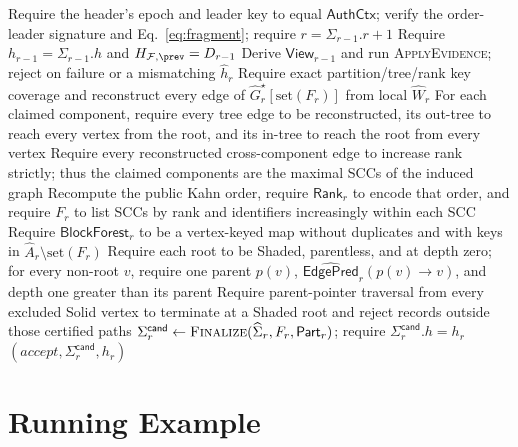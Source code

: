 \begin{algorithm}[h!]
\caption{\textsc{VerifyFragment}: Expanded Verification}
\label{alg:verify-fragment-expanded}
\footnotesize
{}
Require the header's epoch and leader key to equal $\mathsf{AuthCtx}$; verify
the order-leader signature and Eq.~\eqref{eq:fragment}; require
$r=\Sigma_{r-1}.r+1$\;
Require $h_{r-1}=\Sigma_{r-1}.h$ and
$H_{\mathcal F,\prev}=D_{r-1}$\;
Derive $\mathsf{View}_{r-1}$ and run
\textsc{ApplyEvidence}; reject on failure or a mismatching $\widehat h_r$\;
Require exact partition/tree/rank key coverage and reconstruct every edge of
$\widehat G_r^\star[\mathrm{set}(F_r)]$ from local $\widehat W_r$\;
For each claimed component, require every tree edge to be reconstructed, its
out-tree to reach every vertex from the root, and its in-tree to reach the root
from every vertex\;
Require every reconstructed cross-component edge to increase rank strictly;
thus the claimed components are the maximal SCCs of the induced graph\;
Recompute the public Kahn order, require $\mathsf{Rank}_r$ to encode that order,
and require $F_r$ to list SCCs by rank and identifiers increasingly within each
SCC\;
Require $\mathsf{BlockForest}_r$ to be a vertex-keyed map without
duplicates and with keys in
$\widehat A_r\setminus\mathrm{set}(F_r)$\;
Require each root to be Shaded, parentless, and at depth zero; for every
non-root $v$, require one parent $p(v)$,
$\widehat{\mathsf{EdgePred}}_r(p(v)\to v)$, and depth one greater than its
parent\;
Require parent-pointer traversal from every excluded Solid vertex to terminate
at a Shaded root and reject records outside those certified paths\;
$\Sigma_r^{\mathsf{cand}}\gets
  \textsc{Finalize}(\widehat\Sigma_r,F_r,\mathsf{Part}_r)$;
require $\Sigma_r^{\mathsf{cand}}.h=h_r$\;
\KwRet $(accept,\Sigma_r^{\mathsf{cand}},h_r)$
\end{algorithm}

\section{Running Example}
\label{app:running-example}

